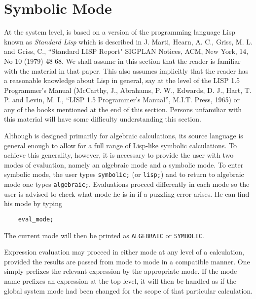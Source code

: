 \chapter{Symbolic Mode}

\hypertarget{target:modes}{}

At the system level, {\REDUCE} is based on a version of the programming
language Lisp known as {\em Standard Lisp\/} which is described
in J. Marti, Hearn, A. C., Griss, M. L. and Griss, C., ``Standard LISP
Report" SIGPLAN Notices, ACM, New York, 14, No 10 (1979) 48-68.  We shall
assume in this section that the reader is familiar with the material in
that paper.  This also assumes implicitly that the reader has a reasonable
knowledge about Lisp in general, say at the level of the LISP 1.5
Programmer's Manual (McCarthy, J., Abrahams, P. W., Edwards, D. J., Hart,
T. P. and Levin, M. I., ``LISP 1.5 Programmer's Manual'', M.I.T.  Press,
1965) or any of the books mentioned at the end of this section.  Persons
unfamiliar with this material will have some difficulty understanding this
section.

Although {\REDUCE} is designed primarily for algebraic calculations, its
source language is general enough to allow for a full range of Lisp-like
symbolic calculations.  To achieve this generality, however, it is
necessary to provide the user with two modes of evaluation, namely an
algebraic mode and a symbolic mode. To enter symbolic mode, the user types {\tt symbolic;}
 (or {\tt lisp;}) and to return to
algebraic mode one types {\tt algebraic;}.
Evaluations proceed differently in each mode so the user is advised to
check what mode he is in if a puzzling error arises.  He can find his mode
by typing

\begin{verbatim}
	eval_mode;
\end{verbatim}
The current mode will then be printed as {\tt ALGEBRAIC} or {\tt SYMBOLIC}.

Expression evaluation may proceed in either mode at any level of a
calculation, provided the results are passed from mode to mode in a
compatible manner. One simply prefixes the relevant expression by the
appropriate mode. If the mode name prefixes an expression at the top
level, it will then be handled as if the global system mode had been
changed for the scope of that particular calculation.

